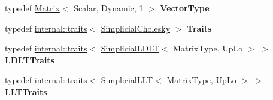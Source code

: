 \begin{DoxyCompactItemize}
typedef \mbox{\hyperlink{class_eigen_1_1_matrix}{Matrix}}$<$ Scalar, Dynamic, 1 $>$ {\bfseries Vector\+Type}
\item 
\mbox{\label{class_eigen_1_1_simplicial_cholesky_a55dbf410b228110e130774cbc81f1748}} 
typedef \mbox{\hyperlink{struct_eigen_1_1internal_1_1traits}{internal\+::traits}}$<$ \mbox{\hyperlink{class_eigen_1_1_simplicial_cholesky}{Simplicial\+Cholesky}} $>$ {\bfseries Traits}
\item 
\mbox{\label{class_eigen_1_1_simplicial_cholesky_a712ae422bc52c7645a76e8c11edffc32}} 
typedef \mbox{\hyperlink{struct_eigen_1_1internal_1_1traits}{internal\+::traits}}$<$ \mbox{\hyperlink{class_eigen_1_1_simplicial_l_d_l_t}{Simplicial\+L\+D\+LT}}$<$ Matrix\+Type, Up\+Lo $>$ $>$ {\bfseries L\+D\+L\+T\+Traits}
\item 
\mbox{\label{class_eigen_1_1_simplicial_cholesky_a7ad15981724212e81303ebb215ad83bf}} 
typedef \mbox{\hyperlink{struct_eigen_1_1internal_1_1traits}{internal\+::traits}}$<$ \mbox{\hyperlink{class_eigen_1_1_simplicial_l_l_t}{Simplicial\+L\+LT}}$<$ Matrix\+Type, Up\+Lo $>$ $>$ {\bfseries L\+L\+T\+Traits}
\end{DoxyCompactItemize}
